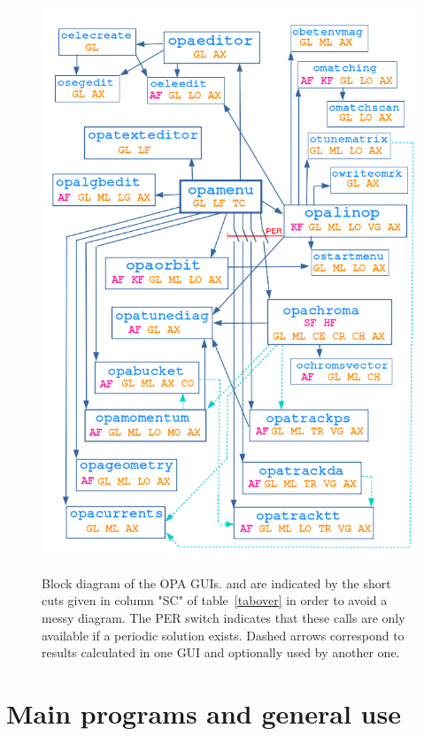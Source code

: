 \documentclass[12pt]{article}
\newcommand\code[1]{{\tt #1}}
\newcommand\guifco[1]{{\color{violet}\code{#1}}}
\newcommand{\unico}[1]{{\color{burntorange}\code{#1}}}
\begin{document}
\begin{figure}
\centering
\includegraphics[width=130mm]{blockdiag.png}
\label{blockfig}
\caption{Block diagram of the OPA GUIs. \guifco{Frames} and \unico{units} are indicated by the short cuts given in column "SC" of table~\ref{tabover} in order to avoid a messy diagram. The {\color{red}\sf\small PER} switch indicates that these calls are only available if a periodic solution exists. Dashed arrows correspond to results calculated in one GUI and optionally used by another one. }
\end{figure}

\pagebreak

\section{\label{secglob}Main programs and general use}
\end{document}
